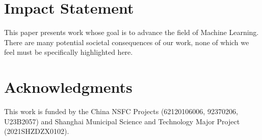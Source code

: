 \documentclass{article}
\theoremstyle{plain}
\theoremstyle{definition}
\theoremstyle{remark}
\begin{document}
\section*{Impact Statement}

This paper presents work whose goal is to advance the field of 
Machine Learning. There are many potential societal consequences 
of our work, none of which we feel must be specifically highlighted here.

\section*{Acknowledgments}

This work is funded by the China NSFC Projects (62120106006, 92370206, U23B2057) and Shanghai Municipal Science and Technology Major Project (2021SHZDZX0102).


\nocite{langley00}





\newpage
\appendix
\onecolumn



\end{document}
